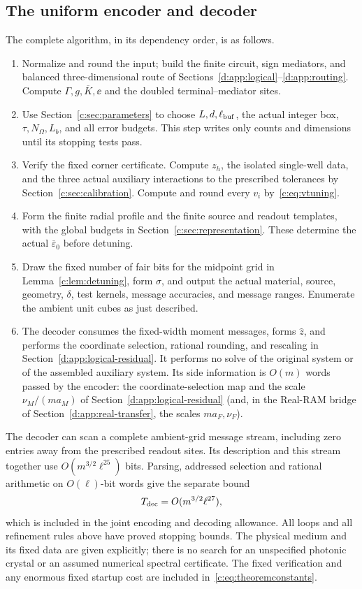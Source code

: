 \subsection{The uniform encoder and decoder}
The complete algorithm, in its dependency order, is as follows.
\begin{enumerate}
\item Normalize and round the input; build the finite circuit, sign
mediators, and balanced three-dimensional route of
Sections~\ref{d:app:logical}--\ref{d:app:routing}. Compute $\Gamma,g,\overline K,\ee$ and the doubled
terminal--mediator sites.
\item Use Section~\ref{c:sec:parameters} to choose $L,d,\ell_{\rm buf}$, the actual
integer box, $\tau,N_\Omega,L_b$, and all error budgets. This step
writes only counts and dimensions until its stopping tests pass.
\item Verify the fixed corner certificate. Compute $z_h$, the isolated
single-well data, and the three actual auxiliary interactions to the
prescribed tolerances by Section~\ref{c:sec:calibration}. Compute and
round every $v_i$ by~\eqref{c:eq:vtuning}.
\item Form the finite radial profile and the finite source and readout
templates, with the global budgets in
Section~\ref{c:sec:representation}. These determine the actual
$\overline\varepsilon_0$ before detuning.
\item Draw the fixed number of fair bits for the midpoint grid in
Lemma~\ref{c:lem:detuning}, form $\sigma$, and output the actual material,
source, geometry, $\delta$, test kernels, message accuracies, and
message ranges. Enumerate the ambient unit cubes as just described.
\item The decoder consumes the fixed-width moment messages, forms
$\widehat z$, and performs the coordinate selection, rational rounding,
and rescaling in Section~\ref{d:app:logical-residual}. It performs no solve
of the original system or of the assembled auxiliary system. Its side
information is $O(m)$ words passed by the encoder: the coordinate-selection
map and the scale $\nu_M/(ma_M)$ of Section~\ref{d:app:logical-residual} (and, in
the Real-RAM bridge of Section~\ref{d:app:real-transfer}, the scales
$ma_F,\nu_F$).
\end{enumerate}
The decoder can scan a complete ambient-grid message stream, including
zero entries away from the prescribed readout sites. Its description
and this stream together use $O(m^{3/2}\ell^{25})$ bits. Parsing,
addressed selection and rational arithmetic on $O(\ell)$-bit words
give the separate bound
\begin{equation}
 T_{\rm dec}=O(m^{3/2}\ell^{27}),                         \label{c:eq:decoder-cost}
\end{equation}
which is included in the joint encoding and decoding allowance.
All loops and all refinement rules above have proved stopping bounds.
The physical medium and its fixed data are given explicitly; there is
no search for an unspecified photonic crystal or an assumed numerical
spectral certificate. The fixed verification and any enormous fixed
startup cost are included in~\eqref{c:eq:theoremconstants}.

